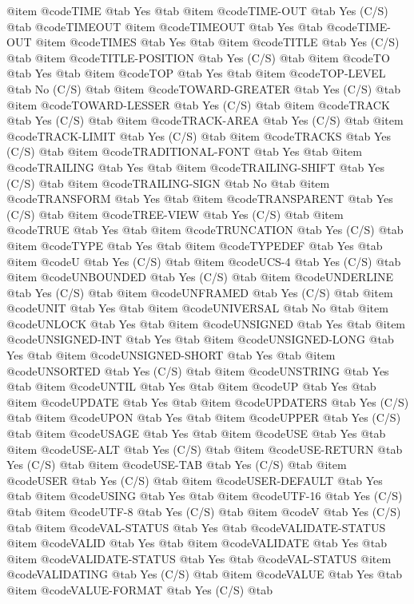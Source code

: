 @item @code{TIME} @tab Yes @tab 
@item @code{TIME-OUT} @tab Yes	(C/S) @tab @code{TIMEOUT}
@item @code{TIMEOUT} @tab Yes @tab @code{TIME-OUT}
@item @code{TIMES} @tab Yes @tab 
@item @code{TITLE} @tab Yes	(C/S) @tab 
@item @code{TITLE-POSITION} @tab Yes	(C/S) @tab 
@item @code{TO} @tab Yes @tab 
@item @code{TOP} @tab Yes @tab 
@item @code{TOP-LEVEL} @tab No	(C/S) @tab 
@item @code{TOWARD-GREATER} @tab Yes	(C/S) @tab 
@item @code{TOWARD-LESSER} @tab Yes	(C/S) @tab 
@item @code{TRACK} @tab Yes	(C/S) @tab 
@item @code{TRACK-AREA} @tab Yes	(C/S) @tab 
@item @code{TRACK-LIMIT} @tab Yes	(C/S) @tab 
@item @code{TRACKS} @tab Yes	(C/S) @tab 
@item @code{TRADITIONAL-FONT} @tab Yes @tab 
@item @code{TRAILING} @tab Yes @tab 
@item @code{TRAILING-SHIFT} @tab Yes	(C/S) @tab 
@item @code{TRAILING-SIGN} @tab No @tab 
@item @code{TRANSFORM} @tab Yes @tab 
@item @code{TRANSPARENT} @tab Yes	(C/S) @tab 
@item @code{TREE-VIEW} @tab Yes	(C/S) @tab 
@item @code{TRUE} @tab Yes @tab 
@item @code{TRUNCATION} @tab Yes	(C/S) @tab 
@item @code{TYPE} @tab Yes @tab 
@item @code{TYPEDEF} @tab Yes @tab 
@item @code{U} @tab Yes	(C/S) @tab 
@item @code{UCS-4} @tab Yes	(C/S) @tab 
@item @code{UNBOUNDED} @tab Yes	(C/S) @tab 
@item @code{UNDERLINE} @tab Yes	(C/S) @tab 
@item @code{UNFRAMED} @tab Yes	(C/S) @tab 
@item @code{UNIT} @tab Yes @tab 
@item @code{UNIVERSAL} @tab No @tab 
@item @code{UNLOCK} @tab Yes @tab 
@item @code{UNSIGNED} @tab Yes @tab 
@item @code{UNSIGNED-INT} @tab Yes @tab 
@item @code{UNSIGNED-LONG} @tab Yes @tab 
@item @code{UNSIGNED-SHORT} @tab Yes @tab 
@item @code{UNSORTED} @tab Yes	(C/S) @tab 
@item @code{UNSTRING} @tab Yes @tab 
@item @code{UNTIL} @tab Yes @tab 
@item @code{UP} @tab Yes @tab 
@item @code{UPDATE} @tab Yes @tab 
@item @code{UPDATERS} @tab Yes	(C/S) @tab 
@item @code{UPON} @tab Yes @tab 
@item @code{UPPER} @tab Yes	(C/S) @tab 
@item @code{USAGE} @tab Yes @tab 
@item @code{USE} @tab Yes @tab 
@item @code{USE-ALT} @tab Yes	(C/S) @tab 
@item @code{USE-RETURN} @tab Yes	(C/S) @tab 
@item @code{USE-TAB} @tab Yes	(C/S) @tab 
@item @code{USER} @tab Yes	(C/S) @tab 
@item @code{USER-DEFAULT} @tab Yes @tab 
@item @code{USING} @tab Yes @tab 
@item @code{UTF-16} @tab Yes	(C/S) @tab 
@item @code{UTF-8} @tab Yes	(C/S) @tab 
@item @code{V} @tab Yes	(C/S) @tab 
@item @code{VAL-STATUS} @tab Yes @tab @code{VALIDATE-STATUS}
@item @code{VALID} @tab Yes @tab 
@item @code{VALIDATE} @tab Yes @tab 
@item @code{VALIDATE-STATUS} @tab Yes @tab @code{VAL-STATUS}
@item @code{VALIDATING} @tab Yes	(C/S) @tab 
@item @code{VALUE} @tab Yes @tab 
@item @code{VALUE-FORMAT} @tab Yes	(C/S) @tab 
